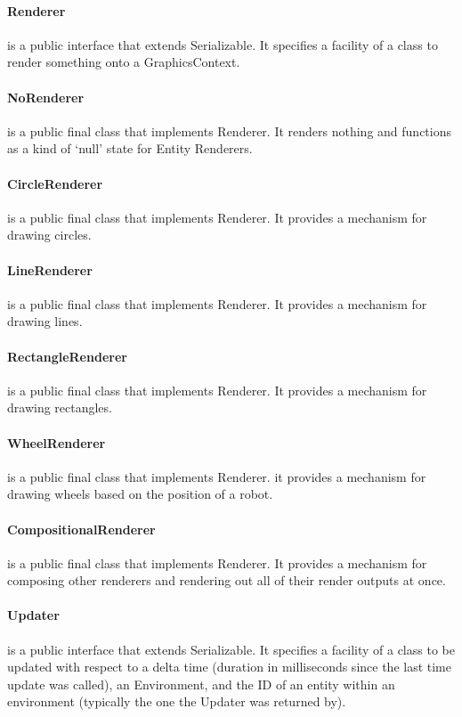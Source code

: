 \paragraph{Renderer} is a public interface that extends Serializable. It specifies a facility of a class to render something onto a GraphicsContext.

\paragraph{NoRenderer} is a public final class that implements Renderer. It renders nothing and functions as a kind of `null' state for Entity Renderers.

\paragraph{CircleRenderer} is a public final class that implements Renderer. It provides a mechanism for drawing circles.

\paragraph{LineRenderer} is a public final class that implements Renderer. It provides a mechanism for drawing lines.




\paragraph{RectangleRenderer} is a public final class that implements Renderer. It provides a mechanism for drawing rectangles.

\paragraph{WheelRenderer} is a public final class that implements Renderer. it provides a mechanism for drawing wheels based on the position of a robot.

\paragraph{CompositionalRenderer} is a public final class that implements Renderer. It provides a mechanism for composing other renderers and rendering out all of their render outputs at once.

\paragraph{Updater} is a public interface that extends Serializable. It specifies a facility of a class to be updated with respect to a delta time (duration in milliseconds since the last time update was called), an Environment, and the ID of an entity within an environment (typically the one the Updater was returned by).

